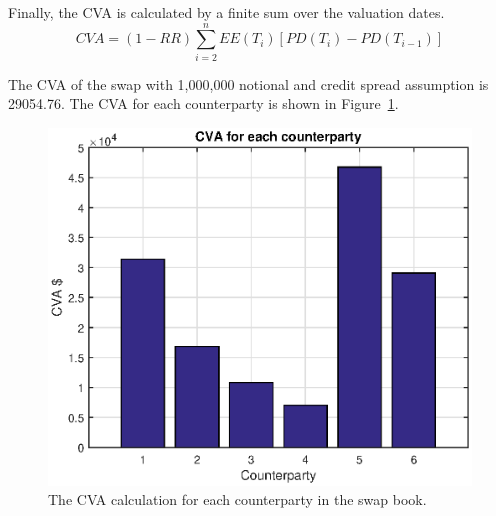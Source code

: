 Finally, the CVA is calculated by a finite sum over the valuation dates.
$$
CVA = (1-RR)\sum_{i=2}^n EE(T_i) [PD(T_i)-PD(T_{i-1})]
$$

The CVA of the swap with 1,000,000 notional and credit spread assumption is 29054.76. The CVA for each counterparty is shown in Figure~\ref{fig::cva_calc}.

\begin{center}
  \begin{figure}
  \centering
      \includegraphics[scale=0.6]{cva_calc.eps}
      \caption{The CVA calculation for each counterparty in the swap book.}\label{fig::cva_calc}
  \end{figure}
\end{center}